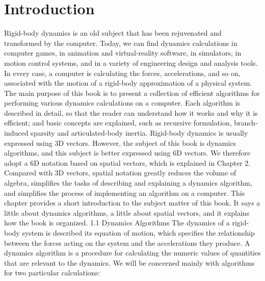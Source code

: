 \chapter{Introduction}
\label{chap:1}
Rigid-body dynamics is an old subject that has been rejuvenated and transformed by the computer. Today, we can find dynamics calculations in computer games, in animation and virtual-reality software, in simulators, in motion control systems, and in a variety of engineering design and analysis tools. In every case, a computer is calculating the forces, accelerations, and so on, associated with the motion of a rigid-body approximation of a physical system. The main purpose of this book is to present a collection of efficient algorithms for performing various dynamics calculations on a computer. Each algorithm is described in detail, so that the reader can understand how it works and why it is efficient; and basic concepts are explained, such as recursive formulation, branch-induced sparsity and articulated-body inertia. Rigid-body dynamics is usually expressed using 3D vectors. However, the subject of this book is dynamics algorithms, and this subject is better expressed using 6D vectors. We therefore adopt a 6D notation based on spatial vectors, which is explained in Chapter 2. Compared with 3D vectors, spatial notation greatly reduces the volume of algebra, simplifies the tasks of describing and explaining a dynamics algorithm, and simplifies the process of implementing an algorithm on a computer. This chapter provides a short introduction to the subject matter of this book. It says a little about dynamics algorithms, a little about spatial vectors, and it explains how the book is organized. 1.1 Dynamics Algorithms The dynamics of a rigid-body system is described its equation of motion, which specifies the relationship between the forces acting on the system and the accelerations they produce. A dynamics algorithm is a procedure for calculating the numeric values of quantities that are relevant to the dynamics. We will be concerned mainly with algorithms for two particular calculations:

